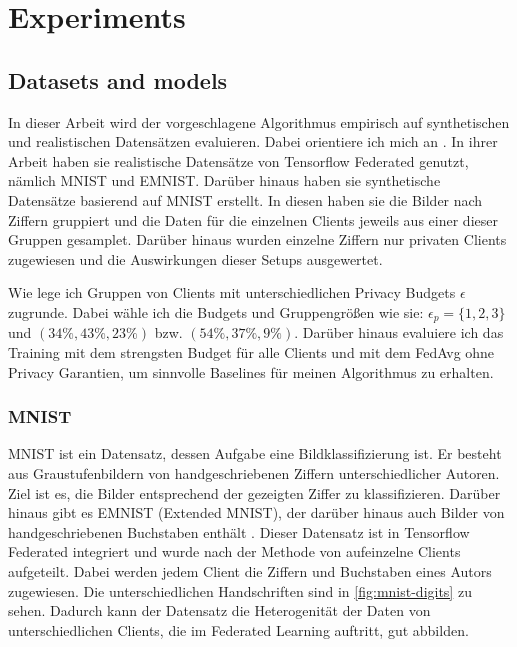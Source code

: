 \chapter{Experiments}

\section{Datasets and models}

In dieser Arbeit wird der vorgeschlagene Algorithmus empirisch auf synthetischen und realistischen Datensätzen evaluieren. Dabei orientiere ich mich an \textcite{aldaghri:2023}. In ihrer Arbeit haben sie realistische Datensätze von Tensorflow Federated genutzt, nämlich MNIST und EMNIST. Darüber hinaus haben sie synthetische Datensätze basierend auf MNIST erstellt. In diesen haben sie die Bilder nach Ziffern gruppiert und die Daten für die einzelnen Clients jeweils aus einer dieser Gruppen gesamplet. Darüber hinaus wurden einzelne Ziffern nur privaten Clients zugewiesen und die Auswirkungen dieser Setups ausgewertet.

Wie \textcite{boenisch:2023} lege ich Gruppen von Clients mit unterschiedlichen Privacy Budgets $\epsilon$ zugrunde. Dabei wähle ich die Budgets und Gruppengrößen wie sie: $\epsilon_p = \{1,2,3\}$ und $(34\%, 43\%, 23\%)$ bzw. $(54\%, 37\%, 9\%)$. Darüber hinaus evaluiere ich das Training mit dem strengsten Budget für alle Clients und mit dem FedAvg ohne Privacy Garantien, um sinnvolle Baselines für meinen Algorithmus zu erhalten.

\subsection{MNIST}
MNIST ist ein Datensatz, dessen Aufgabe eine Bildklassifizierung ist. Er besteht aus Graustufenbildern von handgeschriebenen Ziffern unterschiedlicher Autoren. Ziel ist es, die Bilder entsprechend der gezeigten Ziffer zu klassifizieren. Darüber hinaus gibt es EMNIST (Extended MNIST), der darüber hinaus auch Bilder von handgeschriebenen Buchstaben enthält \parencite{cohen:2017}. Dieser Datensatz ist in Tensorflow Federated integriert und wurde nach der Methode von \textcite{caldas:2018} aufeinzelne Clients aufgeteilt. Dabei werden jedem Client die Ziffern und Buchstaben eines Autors zugewiesen. Die unterschiedlichen Handschriften sind in \autoref{fig:mnist-digits} zu sehen. Dadurch kann der Datensatz die Heterogenität der Daten von unterschiedlichen Clients, die im Federated Learning auftritt, gut abbilden.

